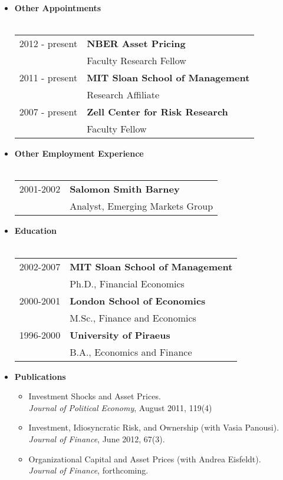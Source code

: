 \documentclass[11pt,letterpaper,overlapped]{res}
\begin{document}
\begin{resume}
\begin{itemize}
\item \textbf{Other Appointments}\\
\\
\begin{tabular}{ll}
2012 - present & \textbf{NBER Asset Pricing}\\
& Faculty Research Fellow\\[0.2cm]
2011 - present & \textbf{MIT Sloan School of Management}\\
& Research Affiliate \\[0.2cm]
2007 - present & \textbf{Zell Center for Risk Research}\\
& Faculty Fellow  \\[0.2cm]
\end{tabular}
\vspace{0.6cm}
\item \textbf{Other Employment Experience}\\\\
\begin{tabular}{ll}
2001-2002 & \textbf{Salomon Smith Barney}\\
& Analyst, Emerging Markets Group\\[0.2cm]
\end{tabular}
\vspace{0.6cm}

\item \textbf{Education}\\
\\
\begin{tabular}{ll}
2002-2007 & \textbf{MIT Sloan School of Management}\\
& Ph.D., Financial Economics\\[0.2cm]
2000-2001 & \textbf{London School of Economics}\\
& M.Sc., Finance and Economics \\[0.2cm]
1996-2000 & \textbf{University of Piraeus} \\
& B.A., Economics and Finance\\[0.2cm]
\end{tabular}
 
\newpage

\item \textbf{Publications}
\begin{itemize}
\item Investment Shocks and Asset Prices.\\
\emph{Journal of Political Economy},  August 2011, 119(4)
\item Investment, Idiosyncratic Risk, and Ownership (with Vasia Panousi).\\
\emph{Journal of Finance}, June 2012, 67(3).
\item Organizational Capital and Asset Prices (with Andrea Eisfeldt).\\
\emph{Journal of Finance}, forthcoming.
\end{itemize}
\vspace{0.5cm}


\end{itemize}
\end{resume}
\end{document}
